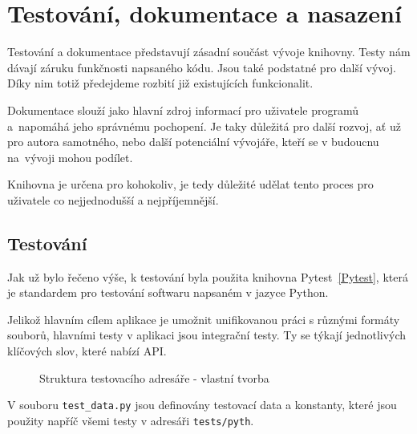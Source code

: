\chapter{Testování, dokumentace a nasazení}

Testování a dokumentace představují zásadní součást vývoje knihovny. Testy nám dávají záruku funkčnosti napsaného kódu. Jsou také podstatné pro další vývoj. Díky nim totiž předejdeme rozbití již existujících funkcionalit.

Dokumentace slouží jako hlavní zdroj informací pro uživatele programů a~napomáhá jeho správnému pochopení. Je taky důležitá pro další rozvoj, ať už pro autora samotného, nebo další potenciální vývojáře, kteří se v budoucnu na~vývoji mohou podílet.

Knihovna je určena pro kohokoliv, je tedy důležité udělat tento proces pro uživatele co nejjednodušší a nejpříjemnější.

\section{Testování}

Jak už bylo řečeno výše, k testování byla použita knihovna Pytest~\ref{Pytest}, která je standardem pro testování softwaru napsaném v jazyce Python.

Jelikož hlavním cílem aplikace je umožnit unifikovanou práci s různými formáty souborů, hlavními testy v aplikaci jsou integrační testy. Ty se týkají jednotlivých klíčových slov, které nabízí API.

\begin{figure}[H]
    \captionsetup{name=Struktura}
    \vspace{1ex} 


    \caption{Struktura testovacího adresáře - vlastní tvorba}
    \label{fig:placeholder}
\end{figure}

V souboru \texttt{test\_data.py} jsou definovány testovací data a konstanty, které jsou použity napříč všemi testy v adresáři \texttt{tests/pyth}.

